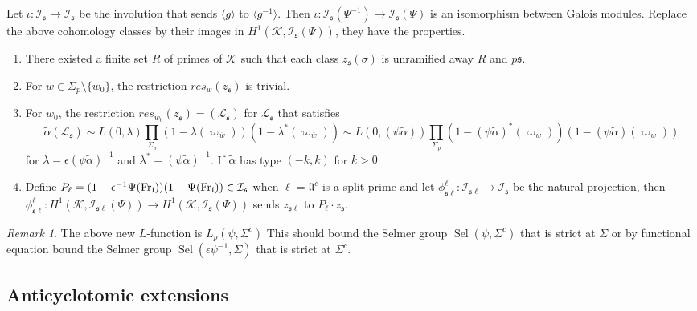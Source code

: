 \documentclass[leqno]{amsart}
\theoremstyle{definition}
\theoremstyle{remark}
\newtheorem{rem}[thm]{Remark}
\newcommand{\Fr}{\textnormal{Fr}} %
\newcommand{\fl}{\mathfrak{l}}
\newcommand{\fs}{\mathfrak{s}}
\newcommand{\K}{{\mathcal{K}}} %
\newcommand{\bw}{\overline{w}}
\newcommand{\I}{\mathcal{I}} %
\DeclareMathOperator{\Sel}{Sel}
\begin{document}
Let $\iota\colon \I_\fs\to \I_\fs$
be the involution that sends $\langle g\rangle$
to $\langle g^{-1}\rangle$.
Then $\iota\colon \I_\fs(\Psi^{-1})\to \I_\fs(\Psi)$
is an isomorphism between Galois modules. 
Replace the above cohomology classes by their images
in $H^1(\K, \I_\fs(\Psi))$, they have the properties.
\begin{enumerate}
    \item There existed a finite set $R$ of primes of $\K$
    such that each class $z_\fs(\sigma)$ is unramified 
    away $R$ and $p\fs$.
    \item For $w\in \Sigma_p\setminus\{w_0\}$,
    the restriction $res_{w}(z_\fs)$ is trivial.
    \item For $w_0$,
    the restriction $res_{w_0}(z_\fs)=(\mathcal{L}_{\fs})$
    for $\mathcal{L}_\fs$ that satisfies
    \[
        \tilde{\alpha}(\mathcal{L}_\fs)
        \sim L(0, \lambda)
        \prod_{\Sigma_p}
        (1-\lambda(\varpi_{\bw}))(1-\lambda^*(\varpi_{\bw}))
        \sim L(0,(\psi\tilde{\alpha}))
        \prod_{\Sigma_p}
        (1-(\psi\tilde{\alpha})^*(\varpi_w))(1-(\psi\tilde{\alpha})(\varpi_{w}))
    \]
    for $\lambda=\epsilon(\psi\tilde{\alpha})^{-1}$
    and $\lambda^*=(\psi\tilde{\alpha})^{-1}$.
    If $\tilde{\alpha}$ has type $(-k,k)$ for $k>0$.
    \item Define $P_\ell=(1-\epsilon^{-1}\Psi(\Fr_\fl))
    (1-\Psi(\Fr_\fl))\in\I_\fs$
    when $\ell=\fl\fl^c$ is a split prime
    and let $\phi_{\fs\ell}^\ell\colon \I_{\fs\ell}\to \I_\fs$
    be the natural projection, then 
    $\phi_{\fs\ell}^{\ell}\colon
	H^1(\K,\I_{\fs\ell}(\Psi))\to H^1(\K,\I_\fs(\Psi))$
    sends $z_{\fs\ell}$ to $P_\ell\cdot z_\fs$.
\end{enumerate}

\begin{rem}
The above new $L$-function is $L_p(\psi, \Sigma^c)$
This should bound the Selmer group
$\Sel(\psi,\Sigma^c)$ that is strict at $\Sigma$
or by functional equation bound the Selmer group
$\Sel(\epsilon\psi^{-1},\Sigma)$
that is strict at $\Sigma^c$.
\end{rem}

\subsection{Anticyclotomic extensions}
\end{document}

